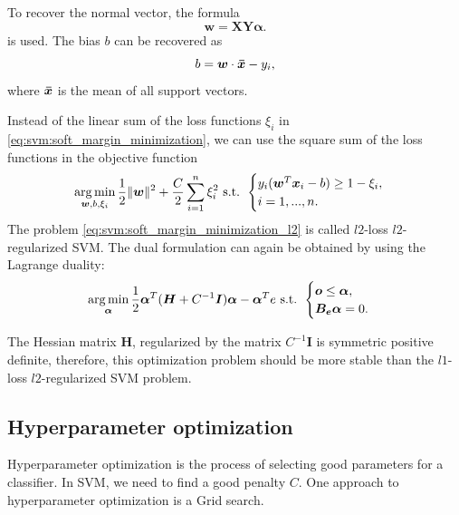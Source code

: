 To recover the normal vector, the formula
\begin{equation}
    \boldsymbol{w}=\boldsymbol{X}\boldsymbol{Y}\boldsymbol{\alpha}.
    \label{eq:svm:dual_to_primal_w}
\end{equation}
is used. The bias $b$ can be recovered as
\begin{equation}
    b=\boldsymbol{w}\cdot \boldsymbol{\Bar{x}} - y_i,
    \label{eq:svm:dual_to_primal_b}
\end{equation}
where $\boldsymbol{\Bar{x}}$ is the mean of all support vectors.

Instead of the linear sum of the loss functions $\xi_i$ in \eqref{eq:svm:soft_margin_minimization}, we can use the square sum of the loss functions in the objective function
\begin{equation}
    \operatorname*{arg\,min}_{\boldsymbol{w},b,\xi_i} \frac{1}{2}\|\boldsymbol{w}\|^2 + \frac{C}{2}\sum_{i = 1}^n\xi_i^2 \text{ s.t. } 
    \begin{cases}
        y_i(\boldsymbol{w}^T\boldsymbol{x}_i-b)\geq1 - \xi_i,\\
        i=1, ...,n.
    \end{cases}
    \label{eq:svm:soft_margin_minimization_l2}
\end{equation}
The problem \eqref{eq:svm:soft_margin_minimization_l2} is called $l2$-loss $l2$-regularized SVM. The dual formulation can again be obtained by using the Lagrange duality:
\begin{equation}
    \operatorname*{arg\,min}_{\boldsymbol{\alpha}} \frac{1}{2} \boldsymbol{\alpha}^T(\boldsymbol{H}+C^{-1}\boldsymbol{I})\boldsymbol{\alpha} - \boldsymbol{\alpha}^Te \text{ s.t. } 
    \begin{cases}
        \boldsymbol{o} \leq \boldsymbol{\alpha},\\
        \boldsymbol{B_e}\boldsymbol{\alpha}=0.
    \end{cases}
    \label{eq:svm:soft_margin_dual-l2}
\end{equation}

The Hessian matrix $\boldsymbol{H}$, regularized by the matrix $C^{-1}\boldsymbol{I}$ is symmetric positive definite, therefore, this optimization problem should be more stable than the $l1$-loss $l2$-regularized SVM problem.

\subsection{Hyperparameter optimization}
Hyperparameter optimization is the process of selecting good parameters for a classifier. In SVM, we need to find a good penalty $C$. One approach to hyperparameter optimization is a Grid search.

